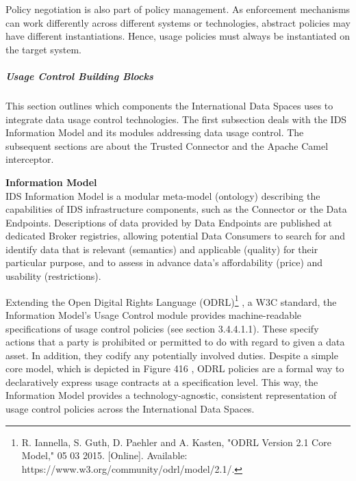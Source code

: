 Policy negotiation is also part of policy management. As enforcement mechanisms can work differently across different systems or technologies, abstract policies may have different instantiations. Hence, usage policies must always be instantiated on the target system.

\subparagraph*{Usage Control Building Blocks \\}
 This section outlines which components the  International  Data Spaces uses to integrate data usage control technologies. The first subsection deals with the IDS Information Model and its modules addressing data usage control. The subsequent sections are about the Trusted Connector and the Apache Camel interceptor.  


\textbf{Information Model}\\
IDS  Information Model is a modular meta-model (ontology) describing the capabilities of IDS infrastructure components, such as the Connector or the Data Endpoints. Descriptions of data provided by Data Endpoints are published at dedicated Broker registries, allowing potential Data Consumers to search for and identify data that is relevant (semantics) and applicable (quality) for their particular  purpose, and to assess in advance data’s affordability (price) and usability (restrictions).

Extending the Open Digital Rights Language (ODRL)\footnote{ R. Iannella, S. Guth, D. Paehler and A. Kasten, "ODRL Version 2.1 Core Model," 05 03 2015. [Online]. Available: https://www.w3.org/community/odrl/model/2.1/.}  , a W3C standard, the Information Model’s Usage Control module provides machine-readable specifications of usage control policies (see section 3.4.4.1.1). These specify actions that a party is prohibited or permitted to do with regard to given a data asset. In addition, they codify any potentially involved duties. Despite a simple core model, which is depicted in  Figure 416 , ODRL policies are a formal way to declaratively express usage contracts at a specification level. This way, the Information Model provides a technology-agnostic, consistent representation of usage control policies across the International Data Spaces. 





